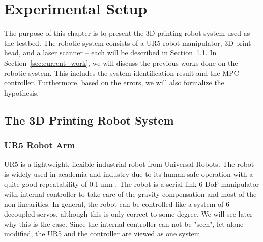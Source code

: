 \chapter{Experimental Setup} \label{chap:testbed}

The purpose of this chapter is to present the 3D printing robot system used as the testbed. The robotic system consists of a UR5 robot manipulator, 3D print head, and a laser scanner -- each will be described in Section~\ref{sec:ur5}. In Section~\ref{sec:current_work}, we will discuss the previous works done on the robotic system. This includes the system identification result and the \ac {MPC} controller. Furthermore, based on the errors, we will also formalize the hypothesis.
\section{The 3D Printing Robot System} \label{sec:ur5}
\subsection{UR5 Robot Arm} \label{subsec:ur5}
UR5 is a lightweight, flexible industrial robot from Universal Robots. The robot is widely used in academia and industry due to its human-safe operation with a quite good repeatability of 0.1 mm \cite{UR5} \cite{6942896}. The robot is a serial link 6 \ac{DoF} manipulator with internal controller to take care of the gravity compensation and most of the non-linearities. In general, the robot can be controlled like a system of 6 decoupled servos, although this is only correct to some degree. We will see later why this is the case. Since the internal controller can not be "seen", let alone modified, the UR5 and the controller are viewed as one system. 

